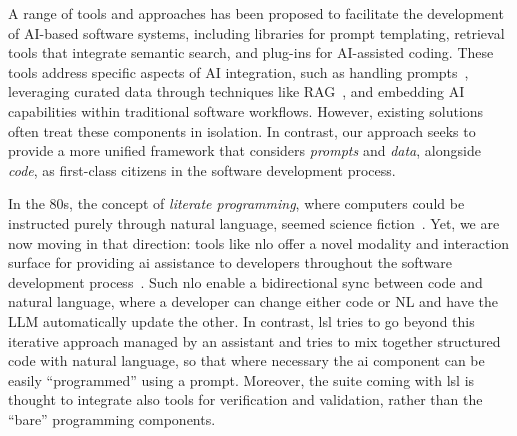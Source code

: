 \documentclass[manuscript,screen]{acmart}
\begin{document}


A range of tools and approaches has been proposed to facilitate the development of AI-based software systems, including libraries for prompt templating, retrieval tools that integrate semantic search, and plug-ins for AI-assisted coding. These tools address specific aspects of AI integration, such as handling prompts~\cite{DBLP:journals/corr/abs-2503-02400,DBLP:journals/pacmse/LiangLRM25}, leveraging curated data through techniques like RAG~\cite{DBLP:conf/cain/BarnettKTB024,DBLP:conf/icse/Shao0S00025}, and embedding AI capabilities within traditional software workflows. However, existing solutions often treat these components in isolation. In contrast, our approach seeks to provide a more unified framework that considers \emph{prompts} and \emph{data}, alongside \emph{code}, as first-class citizens in the software development process.

In the 80s, the concept of \emph{literate programming}, where computers could be instructed purely through natural language, seemed science fiction~\cite{DBLP:journals/cj/Knuth84}.
Yet, we are now moving in that direction: tools like \ac{nlo} offer a novel modality and interaction surface for providing \ac{ai} assistance to developers throughout the software development process~\cite{DBLP:conf/sigsoft/ShiAACGKNPRRRST25}.
Such \ac{nlo} enable a bidirectional sync between code and natural language, where a developer can change either code or NL and have the LLM automatically update the other.
In contrast, \ac{lsl} tries to go beyond this iterative approach managed by an assistant and tries to mix together structured code with natural language, so that where necessary the \ac{ai} component can be easily ``programmed'' using a prompt.
Moreover, the suite coming with \ac{lsl} is thought to integrate also tools for verification and validation, rather than the ``bare'' programming components.
\end{document}
